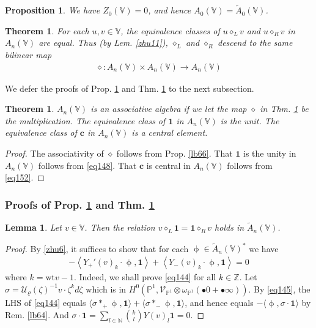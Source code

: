 \documentclass[11pt,b5paper,notitlepage]{article}
\theoremstyle{definition}
\theoremstyle{plain}
\newtheorem{thm}[df]{Theorem}
\newtheorem{pp}[df]{Proposition}
\newtheorem{lm}[df]{Lemma}
\newcommand{\mc}{\mathcal}
\newcommand{\wtd}{\widetilde}
\newcommand{\idt}{\mathbf{1}}
\newcommand{\scr}{\mathscr}
\newcommand{\blt}{\bullet}
\newcommand{\Vbb}{\mathbb V}
\newcommand{\Nbb}{\mathbb N}
\newcommand{\Zbb}{\mathbb Z}
\newcommand{\Pbb}{\mathbb P}
\newcommand{\cbf}{\mathbf c}
\newcommand{\wt}{\mathrm{wt}}
\newcommand{\<}{\left\langle}
\renewcommand{\>}{\right\rangle}
\newcommand{\bk}[1]{\langle {#1}\rangle}
\numberwithin{equation}{section}
\begin{document}
\begin{pp}\label{lb69}
We have $Z_0(\Vbb)=0$, and hence $A_0(\Vbb)=\wtd A_0(\Vbb)$.
\end{pp}



\begin{thm}\label{lb68}
For each $u,v\in \Vbb$, the equivalence classes of $u\diamond_L v$ and $u\diamond_R v$ in $A_n(\Vbb)$ are equal. Thus (by Lem. \ref{zhu11}), $\diamond_L$ and $\diamond_R$ descend to the same bilinear map
\begin{align}
\diamond: A_n(\Vbb)\times A_n(\Vbb)\rightarrow A_n(\Vbb) \label{eq147}
\end{align}
\end{thm}


We defer the proofs of Prop. \ref{lb69} and Thm. \ref{lb68} to the next subsection.

   \begin{thm}\label{zhumain}
$A_n(\Vbb)$ is an associative algebra if we let the map $\diamond$ in Thm. \ref{lb68} be the multiplication. The equivalence class of $\idt$ in $A_n(\Vbb)$ is the unit. The equivalence class of $\cbf$ in $A_n(\Vbb)$ is a central element.
    \end{thm}


    \begin{proof}
The associativity of $\diamond$ follows from Prop. \ref{lb66}. That $\idt$ is the unity in $A_n(\Vbb)$ follows from \eqref{eq148}. That $\cbf$ is central in $A_n(\Vbb)$ follows from \eqref{eq152}.
    \end{proof}







\subsubsection{Proofs of Prop. \ref{lb69} and Thm. \ref{lb68}}


\begin{lm}\label{lb65}
Let $v\in\Vbb$. Then the relation $v\diamond_L\idt=\idt\diamond_R v$ holds in $\wtd A_n(\Vbb)$.
\end{lm}


\begin{proof}
By \eqref{zhu6}, it suffices to show that for each $\upphi\in\wtd A_n(\Vbb)^*$ we have
\begin{align}
-\<Y_+'(v)_{k}\cdot\upphi,\idt \>+\<Y_-(v)_{k}\cdot\upphi,\idt \>=0 \label{eq144}
\end{align}
where $k=\wt v-1$. Indeed, we shall prove \eqref{eq144} for all $k\in\Zbb$. Let $\sigma=\mc U_\varrho(\zeta)^{-1}v\cdot \zeta^{k}d\zeta$ which is in $H^0(\Pbb^1,\scr V_{\Pbb^1}\otimes\omega_{\Pbb^1}(\blt 0+\blt\infty))$. By \eqref{eq145}, the LHS of \eqref{eq144} equals $\bk{\sigma*_+\upphi,\idt}+\bk{\sigma*_-\upphi,\idt}$, and hence equals $-\bk{\upphi,\sigma \cdot \idt}$ by Rem. \ref{lb64}. And $\sigma\cdot \idt=\sum_{l\in\Nbb}{k\choose l}Y(v)_l\idt=0$.
\end{proof}
\end{document}
